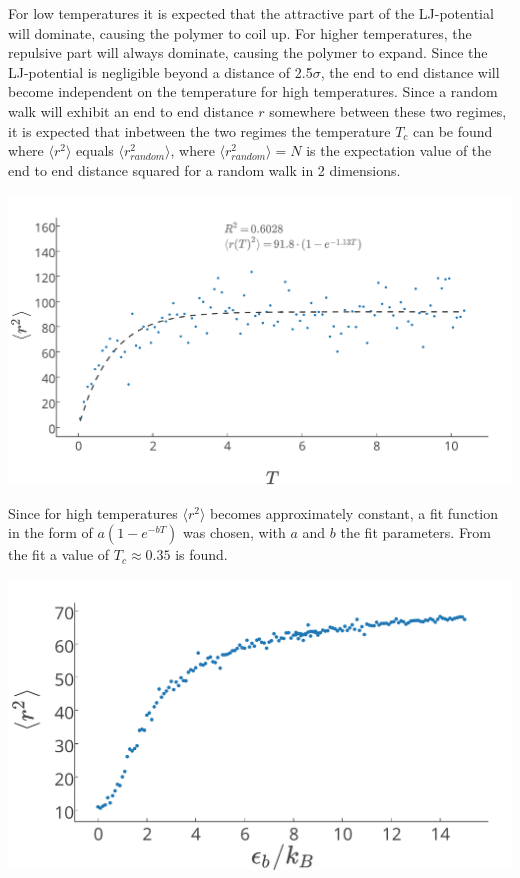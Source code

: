 For low temperatures it is expected that the attractive part of the LJ-potential will dominate, causing the polymer to coil up. For higher temperatures, the repulsive part will always dominate, causing the polymer to expand. Since the LJ-potential is negligible beyond a distance of 2.5$\sigma$, the end to end distance will become independent on the temperature for high temperatures. Since a random walk will exhibit an end to end distance $r$ somewhere between these two regimes, it is expected that inbetween the two regimes the temperature $T_c$ can be found where $\langle r^2 \rangle$ equals $\langle r_{random}^2 \rangle$, where $\langle r_{random}^2 \rangle = N$ is the expectation value of the end to end distance squared for a random walk in 2 dimensions.
\begin{Figure}
  \centerfloat
     \includegraphics[scale=0.4]{end_to_end_distance_as_function_of_the_temperature.pdf}
 \label{fig:end_to_end_afo_temperature}
\end{Figure} Since for high temperatures $\langle r^2 \rangle$ becomes approximately constant, a fit function in the form of $a(1-e^{-bT})$ was chosen, with $a$ and $b$ the fit parameters. From the fit a value of $T_c \approx 0.35$ is found.

\begin{Figure}
  \centerfloat
     \includegraphics[scale=0.4]{radius_of_gyr_bending.pdf}
 \label{fig:radius_of_gyr_bending}
\end{Figure}

